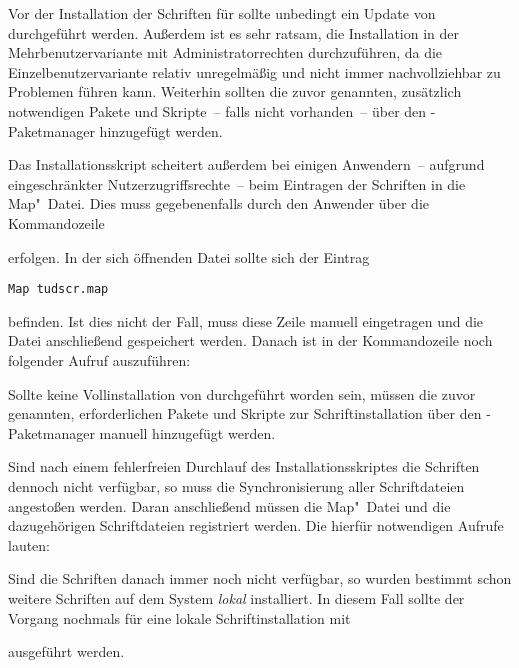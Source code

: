 
Vor der Installation der Schriften für \TUDScript sollte unbedingt ein Update 
von \MiKTeX durchgeführt werden. Außerdem ist es sehr ratsam, die Installation 
in der Mehrbenutzervariante mit Administratorrechten durchzuführen, da die 
Einzelbenutzervariante relativ unregelmäßig und nicht immer nachvollziehbar zu 
Problemen führen kann. Weiterhin sollten die zuvor genannten, zusätzlich 
notwendigen Pakete und Skripte~-- falls nicht vorhanden~-- über den 
\MiKTeX-Paketmanager hinzugefügt werden.

Das Installationsskript scheitert außerdem bei einigen Anwendern~-- aufgrund 
eingeschränkter Nutzerzugriffsrechte~-- beim Eintragen der Schriften in die 
Map"~Datei. Dies muss gegebenenfalls durch den Anwender über die Kommandozeile 
%
\begin{quoting}
\RET
\end{quoting}
%
erfolgen. In der sich öffnenden Datei sollte sich der Eintrag 
%
\begin{quoting}
\texttt{Map~tudscr.map}
\end{quoting}
%
befinden. Ist dies nicht der Fall, muss diese Zeile manuell eingetragen und die 
Datei anschließend gespeichert werden. Danach ist in der Kommandozeile noch 
folgender Aufruf auszuführen:
%
\begin{quoting}
\RET
\end{quoting}



Sollte keine Vollinstallation von \TeXLive durchgeführt worden sein, müssen die 
zuvor genannten, erforderlichen Pakete und Skripte zur Schriftinstallation über 
den \TeXLive-Paketmanager manuell hinzugefügt werden.

Sind nach einem fehlerfreien Durchlauf des Installationsskriptes die Schriften 
dennoch nicht verfügbar, so muss die Synchronisierung aller Schriftdateien 
angestoßen werden. Daran anschließend müssen die Map"~Datei und die 
dazugehörigen Schriftdateien registriert werden. Die hierfür notwendigen 
Aufrufe lauten:
%
\begin{quoting}
\RET*
{}\RET*
{}\RET
\end{quoting}
%
Sind die Schriften danach immer noch nicht verfügbar, so wurden bestimmt schon 
weitere Schriften auf dem System \emph{lokal} installiert. In diesem Fall 
sollte der Vorgang nochmals für eine lokale Schriftinstallation mit 
%
\begin{quoting}
\RET*
{}\RET*
{}\RET
\end{quoting}
%
ausgeführt werden. 

